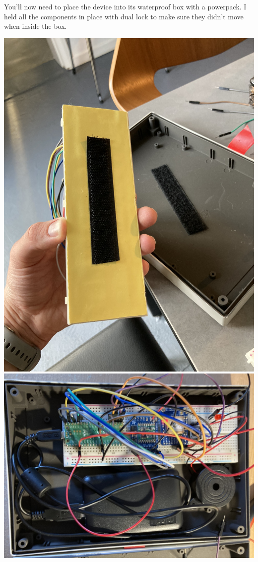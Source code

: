 \documentclass[12pt,a4paper]{report}
\begin{document}
You'll now need to place the device into its waterproof box with a powerpack. I held all the components in place with dual lock to make sure they didn't move when inside the box. 
\begin{center}
\includegraphics[scale = 0.1]{sticky.jpeg}         \includegraphics[scale = 0.1]{insideBox.jpeg} \\ \bigskip

\end{center}
\end{document}
